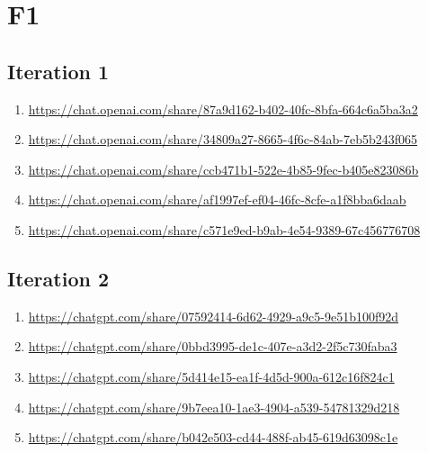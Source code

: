 \section{F1\label{F1-1}}

\subsection{Iteration 1}

\begin{enumerate}
    \item \href{https://chat.openai.com/share/87a9d162-b402-40fc-8bfa-664c6a5ba3a2}{https://chat.openai.com/share/87a9d162-b402-40fc-8bfa-664c6a5ba3a2}
    \item \href{https://chat.openai.com/share/34809a27-8665-4f6c-84ab-7eb5b243f065}{https://chat.openai.com/share/34809a27-8665-4f6c-84ab-7eb5b243f065}
    \item \href{https://chat.openai.com/share/ccb471b1-522e-4b85-9fec-b405e823086b}{https://chat.openai.com/share/ccb471b1-522e-4b85-9fec-b405e823086b}
    \item \href{https://chat.openai.com/share/af1997ef-ef04-46fc-8cfe-a1f8bba6daab}{https://chat.openai.com/share/af1997ef-ef04-46fc-8cfe-a1f8bba6daab}
    \item \href{https://chat.openai.com/share/c571e9ed-b9ab-4e54-9389-67c456776708}{https://chat.openai.com/share/c571e9ed-b9ab-4e54-9389-67c456776708}
\end{enumerate}

\subsection{Iteration 2}

\begin{enumerate}
    \item \href{https://chatgpt.com/share/07592414-6d62-4929-a9c5-9e51b100f92d}{https://chatgpt.com/share/07592414-6d62-4929-a9c5-9e51b100f92d}
    \item \href{https://chatgpt.com/share/0bbd3995-de1c-407e-a3d2-2f5c730faba3}{https://chatgpt.com/share/0bbd3995-de1c-407e-a3d2-2f5c730faba3}
    \item \href{https://chatgpt.com/share/5d414e15-ea1f-4d5d-900a-612c16f824c1}{https://chatgpt.com/share/5d414e15-ea1f-4d5d-900a-612c16f824c1}
    \item \href{https://chatgpt.com/share/9b7eea10-1ae3-4904-a539-54781329d218}{https://chatgpt.com/share/9b7eea10-1ae3-4904-a539-54781329d218}
    \item \href{https://chatgpt.com/share/b042e503-cd44-488f-ab45-619d63098c1e}{https://chatgpt.com/share/b042e503-cd44-488f-ab45-619d63098c1e}
\end{enumerate}

